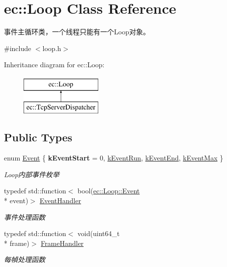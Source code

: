 \hypertarget{classec_1_1Loop}{\section{ec\-:\-:Loop Class Reference}
\label{classec_1_1Loop}
}


事件主循环类，一个线程只能有一个\-Loop对象。  




{\ttfamily \#include $<$loop.\-h$>$}

Inheritance diagram for ec\-:\-:Loop\-:\begin{figure}[H]
\begin{center}
\leavevmode
\includegraphics[height=2.000000cm]{classec_1_1Loop}
\end{center}
\end{figure}
\subsection*{Public Types}
\begin{DoxyCompactItemize}
\item 
enum \hyperlink{classec_1_1Loop_ac861df4ad2e7779e31932b2171935f81}{Event} \{ {\bfseries k\-Event\-Start} = 0, 
\hyperlink{classec_1_1Loop_ac861df4ad2e7779e31932b2171935f81ae18354c950ca663c8eeb805eb0635ce7}{k\-Event\-Run}, 
\hyperlink{classec_1_1Loop_ac861df4ad2e7779e31932b2171935f81af538557b2dd5e6dd576a16a8b510f9d8}{k\-Event\-End}, 
\hyperlink{classec_1_1Loop_ac861df4ad2e7779e31932b2171935f81a4ce3e65585742fda1ced3e6ba87bb80c}{k\-Event\-Max}
 \}
\begin{DoxyCompactList}\small\item\em Loop内部事件枚举 \end{DoxyCompactList}\item 
typedef std\-::function$<$ bool(\hyperlink{classec_1_1Loop_ac861df4ad2e7779e31932b2171935f81}{ec\-::\-Loop\-::\-Event} \\*
event)$>$ \hyperlink{classec_1_1Loop_a7c68e22f03ea2b4b670a440291438aed}{Event\-Handler}
\begin{DoxyCompactList}\small\item\em 事件处理函数 \end{DoxyCompactList}\item 
typedef std\-::function$<$ void(uint64\-\_\-t \\*
frame)$>$ \hyperlink{classec_1_1Loop_aaa0d9bf951a410663fc354e5be062229}{Frame\-Handler}
\begin{DoxyCompactList}\small\item\em 每幀处理函数 \end{DoxyCompactList}\end{DoxyCompactItemize}
